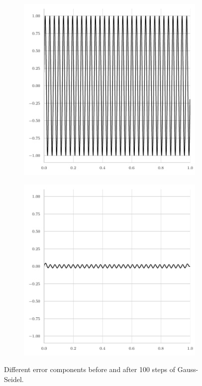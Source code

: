 \begin{figure}
\begin{subfigure}[b]{0.45\textwidth}
	\end{subfigure}
	\begin{subfigure}[b]{0.45\textwidth}
		\centering
		\includegraphics[width=\textwidth]{figures/initial_error_gauss_seidel_64pi.pdf}
	\end{subfigure}
	\hfill
	\begin{subfigure}[b]{0.45\textwidth}
		\centering
		\includegraphics[width=\textwidth]{figures/final_error_gauss_seidel_64pi.pdf}
	\end{subfigure}
	\caption{Different error components before and after 100 steps of Gauss-Seidel.}
	\label{fig:different-error-components-gauss-seidel}
\end{figure}

